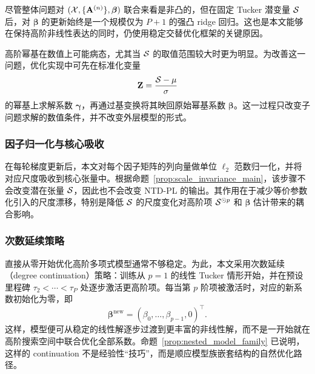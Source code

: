 尽管整体问题对 $(\mathcal{X},\{\mathbf A^{(n)}\},\boldsymbol\beta)$ 联合来看是非凸的，但在固定 Tucker 潜变量 $\mathcal{S}$ 后，对 $\boldsymbol\beta$ 的更新始终是一个规模仅为 $P+1$ 的强凸 ridge 回归。这也是本文能够在保持高阶非线性表达的同时，仍使用稳定交替优化框架的关键原因。

高阶幂基在数值上可能病态，尤其当 $\mathcal{S}$ 的取值范围较大时更为明显。为改善这一问题，优化实现中可先在标准化变量
\begin{equation}
\mathbf Z = \frac{\mathcal{S}-\mu}{\sigma}
\end{equation}
的幂基上求解系数 $\boldsymbol\gamma$，再通过基变换将其映回原始幂基系数 $\boldsymbol\beta$。这一过程只改变子问题求解的数值条件，并不改变外层模型的形式。

\subsubsection{因子归一化与核心吸收}

在每轮梯度更新后，本文对每个因子矩阵的列向量做单位 $\ell_2$ 范数归一化，并将对应尺度吸收到核心张量中。根据命题~\ref{prop:scale_invariance_main}，该步骤不会改变潜在张量 $\mathcal{S}$，因此也不会改变 NTD-PL 的输出。其作用在于减少等价参数化引入的尺度漂移，特别是降低 $\mathcal{S}$ 的尺度变化对高阶项 $\mathcal{S}^{\odot p}$ 和 $\boldsymbol\beta$ 估计带来的耦合影响。

\subsubsection{次数延续策略}

直接从零开始优化高阶多项式模型通常不够稳定。为此，本文采用次数延续（degree continuation）策略：训练从 $p=1$ 的线性 Tucker 情形开始，并在预设里程碑 $\tau_2<\cdots<\tau_P$ 处逐步激活更高阶项。每当第 $p$ 阶项被激活时，对应的新系数初始化为零，即
\begin{equation}
\boldsymbol\beta^{\mathrm{new}}
=
(\beta_0,\dots,\beta_{p-1},0)^\top.
\end{equation}
这样，模型便可从稳定的线性解逐步过渡到更丰富的非线性解，而不是一开始就在高阶搜索空间中联合优化全部系数。命题~\ref{prop:nested_model_family} 已说明，这样的 continuation 不是经验性“技巧”，而是顺应模型族嵌套结构的自然优化路径。

